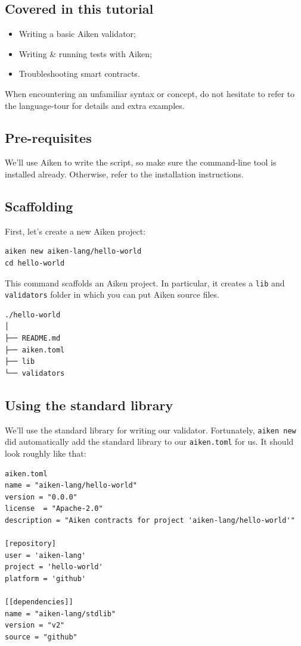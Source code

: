 \subsection{Covered in this tutorial}
\begin{itemize}
  \item Writing a basic Aiken validator;
  \item Writing \& running tests with Aiken;
  \item Troubleshooting smart contracts.
\end{itemize}

When encountering an unfamiliar syntax or concept, do not hesitate to refer to the language-tour for details and extra examples.

\subsection{Pre-requisites}
We'll use Aiken to write the script, so make sure the command-line tool is installed already. Otherwise, refer to the installation instructions.

\subsection{Scaffolding}
First, let's create a new Aiken project:

\begin{verbatim}
aiken new aiken-lang/hello-world
cd hello-world
\end{verbatim}

This command scaffolds an Aiken project. In particular, it creates a \texttt{lib} and \texttt{validators} folder in which you can put Aiken source files.

\begin{verbatim}
./hello-world
│
├── README.md
├── aiken.toml
├── lib
└── validators
\end{verbatim}

\subsection{Using the standard library}
We'll use the standard library for writing our validator. Fortunately, \texttt{aiken new} did automatically add the standard library to our \texttt{aiken.toml} for us. It should look roughly like that:

\begin{verbatim}
aiken.toml
name = "aiken-lang/hello-world"
version = "0.0.0"
license  = "Apache-2.0"
description = "Aiken contracts for project 'aiken-lang/hello-world'"
 
[repository]
user = 'aiken-lang'
project = 'hello-world'
platform = 'github'
 
[[dependencies]]
name = "aiken-lang/stdlib"
version = "v2"
source = "github"
\end{verbatim}

